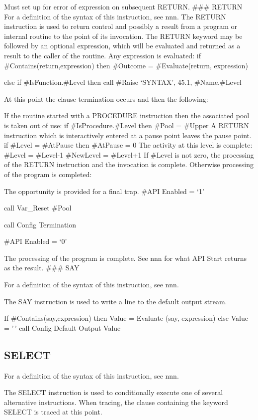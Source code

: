 Must set up for error of expression on subsequent RETURN. \#\#\# RETURN
For a definition of the syntax of this instruction, see nnn. The RETURN
instruction is used to return control and possibly a result from a
program or internal routine to the point of its invocation. The RETURN
keyword may be followed by an optional expression, which will be
evaluated and returned as a result to the caller of the routine. Any
expression is evaluated: if \#Contains(return,expression) then \#Outcome
= \#Evaluate(return, expression)

else if \#IsFunction.\#Level then call \#Raise `SYNTAX', 45.1,
\#Name.\#Level

At this point the clause termination occurs and then the following:

If the routine started with a PROCEDURE instruction then the associated
pool is taken out of use: if \#IsProcedure.\#Level then \#Pool = \#Upper
A RETURN instruction which is interactively entered at a pause point
leaves the pause point. if \#Level = \#AtPause then \#AtPause = 0 The
activity at this level is complete: \#Level = \#Level-1 \#NewLevel =
\#Level+1 If \#Level is not zero, the processing of the RETURN
instruction and the invocation is complete. Otherwise processing of the
program is completed:

The opportunity is provided for a final trap. \#API Enabled = `1'

call Var\_Reset \#Pool

call Config Termination

\#API Enabled = `0'

The processing of the program is complete. See nnn for what API Start
returns as the result. \#\#\# SAY

For a definition of the syntax of this instruction, see nnn.

The SAY instruction is used to write a line to the default output
stream.

If \#Contains(say,expression) then Value = Evaluate (say, expression)
else Value = '\,' call Config Default Output Value

\subsection{SELECT}\label{select}

For a definition of the syntax of this instruction, see nnn.

The SELECT instruction is used to conditionally execute one of several
alternative instructions. When tracing, the clause containing the
keyword SELECT is traced at this point.

